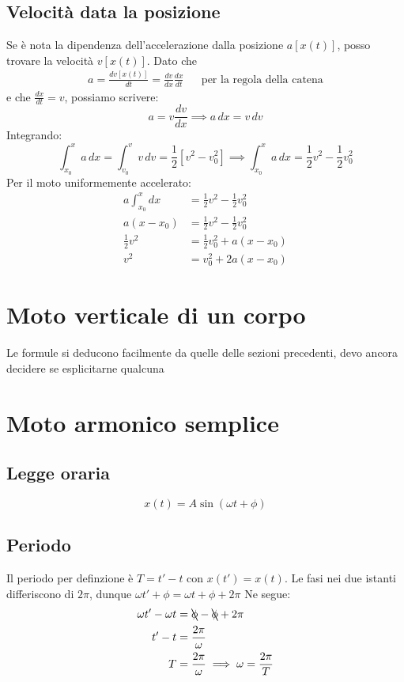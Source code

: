 \documentclass{report}
\begin{document}
\subsection{Velocità data la posizione}
Se è nota la dipendenza dell'accelerazione dalla posizione \(a[x(t)]\), posso
trovare la velocità \(v[x(t)]\). Dato che
\begin{align*}
    a = \frac{dv[x(t)]}{dt} = \frac{dv}{dx}\frac{dx}{dt} && \text{per la regola della catena}
\end{align*}
e che \(\frac{dx}{dt} = v\), possiamo scrivere:
\begin{equation*}
    a = v\frac{dv}{dx} \implies a\,dx = v\,dv
\end{equation*}
Integrando:
\begin{equation}
    \int_{x_0}^{x}a\,dx = \int_{v_0}^{v}v\,dv = \frac{1}{2}[v^2 - v_0^2]
    \implies \int_{x_0}^{x}a\,dx = \frac{1}{2}v^2 - \frac{1}{2}v_0^2
\end{equation}
Per il moto uniformemente accelerato:
\begin{align}
    a\int_{x_0}^{x}dx & = \frac{1}{2}v^2 - \frac{1}{2}v_0^2 \nonumber \\
    a(x - x_0) & = \frac{1}{2}v^2 - \frac{1}{2}v_0^2 \nonumber \\
    \frac{1}{2}v^2 & = \frac{1}{2}v_0^2 + a(x - x_0) \nonumber \\
    v^2 & = v_0^2 + 2a(x - x_0)
\end{align}

\section{Moto verticale di un corpo}
Le formule si deducono facilmente da quelle delle sezioni precedenti, devo ancora decidere se esplicitarne qualcuna

\section{Moto armonico semplice}
\subsection{Legge oraria}
\begin{equation}
    x(t) = A\sin(\omega t + \phi)
\end{equation}
\subsection{Periodo}
Il periodo per definzione è \(T = t' - t\) con \(x(t') = x(t)\). Le fasi nei
due istanti differiscono di \(2\pi\), dunque \(\omega t' + \phi = \omega t + \phi + 2\pi\)
Ne segue:
\begin{align}
    \omega t' - \omega t & = \bcancel{\phi} - \bcancel{\phi} + 2\pi \nonumber \\
    t' - t & = \frac{2\pi}{\omega} \nonumber \\
    T & = \frac{2\pi}{\omega} \implies \omega = \frac{2\pi}{T}
\end{align}
\end{document}
